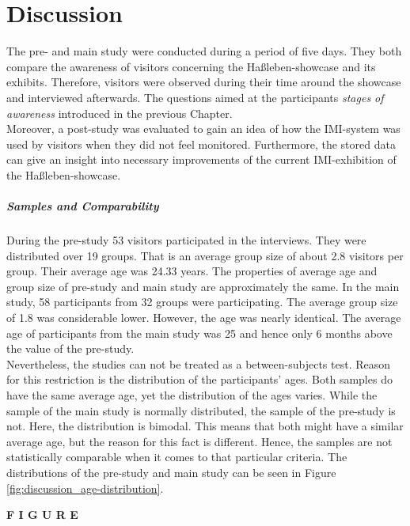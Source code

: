 \chapter{Discussion}
\label{discussion}

The pre- and main study were conducted during a period of five days. They both compare the awareness of visitors concerning the Haßleben-showcase and its exhibits. Therefore, visitors were observed during their time around the showcase and interviewed afterwards. The questions aimed at the participants \textit{stages of awareness} introduced in the previous Chapter.
\\
Moreover, a post-study was evaluated to gain an idea of how the \ac{IMI}-system was used by visitors when they did not feel monitored. Furthermore, the stored data can give an insight into necessary improvements of the current \ac{IMI}-exhibition of the Haßleben-showcase.

\paragraph{Samples and Comparability} During the pre-study 53 visitors participated in the interviews. They were distributed over 19 groups. That is an average group size of about 2.8 visitors per group. Their average age was 24.33 years. The properties of average age and group size of pre-study and main study are approximately the same. In the main study, 58 participants from 32 groups were participating. The average group size of 1.8 was considerable lower. However, the age was nearly identical. The average age of participants from the main study was 25 and hence only 6 months above the value of the pre-study.
\\
Nevertheless, the studies can not be treated as a between-subjects test. Reason for this restriction is the distribution of the participants' ages. Both samples do have the same average age, yet the distribution of the ages varies. While the sample of the main study is normally distributed, the sample of the pre-study is not. Here, the distribution is bimodal. This means that both might have a similar average age, but the reason for this fact is different. Hence, the samples are not statistically comparable when it comes to that particular criteria. The distributions of the pre-study and main study can be seen in Figure \ref{fig:discussion_age-distribution}.

\textbf{F I G U R E}

